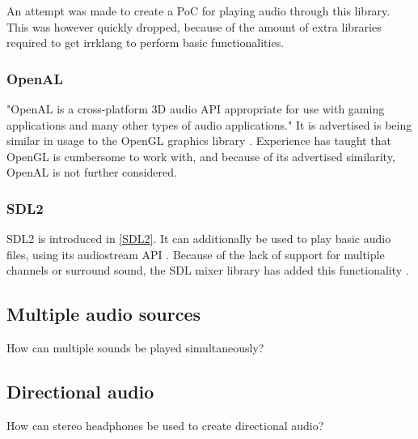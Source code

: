 \documentclass{article} %
\begin{document}
An attempt was made to create a PoC for playing audio through this library. This was however quickly dropped, because of the amount of extra libraries required to get irrklang to perform basic functionalities.

\subsubsection{OpenAL}
"OpenAL is a cross-platform 3D audio API appropriate for use with gaming applications and many other types of audio applications." It is advertised is being similar in usage to the OpenGL graphics library \cite{OpenAL}.
Experience has taught that OpenGL is cumbersome to work with, and because of its advertised similarity, OpenAL is not further considered.

\subsubsection{SDL2}
SDL2 is introduced in \ref{SDL2}. It can additionally be used to play basic audio files, using its audiostream API \cite{SDLaudioStream}.
Because of the lack of support for multiple channels or surround sound, the SDL mixer library has added this functionality \cite{SDLmixer}.

\subsection{Multiple audio sources}
How can multiple sounds be played simultaneously?
\subsection{Directional audio}
How can stereo headphones be used to create directional audio?
\end{document}
